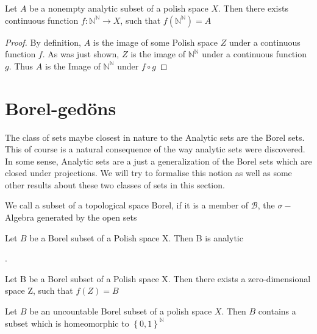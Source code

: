 \documentclass[10pt, a4paper, titlepage]{article}
\numberwithin{equation}{section}
\begin{document}
\begin{theorem}
	Let $A$ be a nonempty analytic subset of a polish space $X$. Then there exists continuous function $f: \mathbb{N}^{\mathbb{N}} \to X$, such that $f\left( \mathbb{N}^{\mathbb{N}} \right) = A$
\end{theorem}
\begin{proof}
	By definition, $A$ is the image of some Polish space $Z$ under a continuous function $f$. As was just shown,  $Z$ is the image of  $\mathbb{N}^\mathbb{N}$ under a continuous function $g$.
	Thus  $A$ is the Image of  $\mathbb{N}^\mathbb{N}$ under $f \circ g$
\end{proof}


\section{Borel-gedöns}
The class of sets maybe closest in nature to the Analytic sets are the Borel sets. 
This of course is a natural consequence of the way analytic sets were discovered. 
In some sense, Analytic sets are a just a generalization of the Borel sets which are closed under projections. 
We will try to formalise this notion as well as some other results about these two classes of sets in this section.

\begin{definition}
	We call a subset of a topological space Borel, if it is a member of $\mathcal{B}$, the $\sigma-$Algebra generated by the open sets
\end{definition}


\begin{theorem}
	Let $B$ be a Borel subset of a Polish space X. Then B is analytic		
\end{theorem}


\begin{definition}
	.	
\end{definition}

\begin{theorem}
	Let B be a Borel subset of a Polish space X. Then there exists a zero-dimensional space Z, such that $f(Z) = B$
\end{theorem}

\begin{theorem}
	Let $B$ be an uncountable Borel subset of a polish space  $X$. Then  $B$ contains a subset which is homeomorphic to  $\left\{ 0,1 \right\}^\mathbb{N}$
	
\end{theorem}
\end{document}

